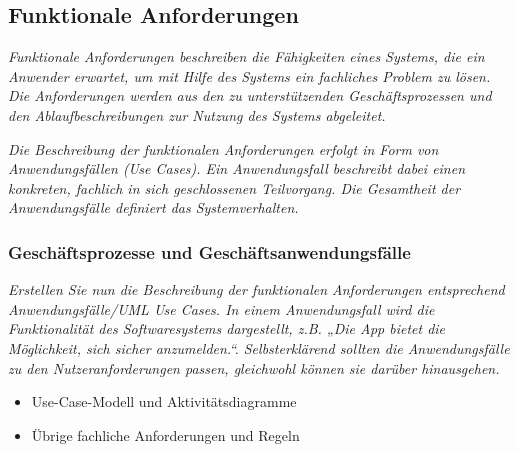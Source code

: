 \subsection{Funktionale Anforderungen}

\textit{
    Funktionale Anforderungen beschreiben die Fähigkeiten eines Systems, die ein Anwender erwartet, um mit Hilfe des Systems ein fachliches Problem zu lösen. Die Anforderungen werden aus den zu unterstützenden Geschäftsprozessen und den Ablaufbeschreibungen zur Nutzung des Systems abgeleitet.
}

\textit{
    Die Beschreibung der funktionalen Anforderungen erfolgt in Form von Anwendungsfällen (Use Cases). Ein Anwendungsfall beschreibt dabei einen konkreten, fachlich in sich geschlossenen Teilvorgang. Die Gesamtheit der Anwendungsfälle definiert das Systemverhalten.
}


\subsubsection{Geschäftsprozesse und Geschäftsanwendungsfälle}

\textit{Erstellen Sie nun die Beschreibung der funktionalen Anforderungen entsprechend Anwendungsfälle/UML Use Cases. In einem Anwendungsfall wird die Funktionalität des Softwaresystems dargestellt, z.B. „Die App bietet die Möglichkeit, sich sicher anzumelden.“. Selbsterklärend sollten die Anwendungsfälle zu den Nutzeranforderungen passen, gleichwohl können sie darüber hinausgehen. }

\begin{itemize}
    \item Use-Case-Modell und Aktivitätsdiagramme 
    \item Übrige fachliche Anforderungen und Regeln
\end{itemize}
